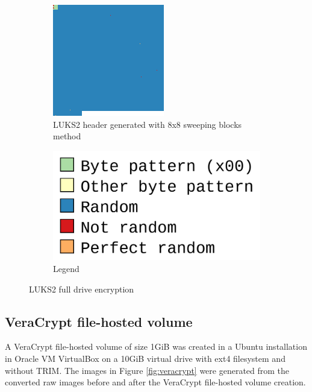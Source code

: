 \documentclass[
  digital, %
  color,   %
  oneside, %
  lof,     %
  nolot,     %
]{fithesis4}
\begin{document}
\begin{figure}
\begin{subfigure}[t]{.45\textwidth}
    \includegraphics[width=\textwidth,interpolate=false]{ext4-luks2-head.png}
    \caption{LUKS2 header generated with 8x8 sweeping blocks method}
    \label{fig:luks-header}
  \end{subfigure}
  \begin{subfigure}[b]{.45\textwidth}
    \centering
    \includegraphics[width=\textwidth]{legend.png}
    \caption{Legend}
    \label{fig:luks-legend} 
  \end{subfigure}
  \caption{LUKS2 full drive encryption}
  \label{fig:luks}
\end{figure}

\subsection{VeraCrypt file-hosted volume}
\label{ssec:veracrypt-file-hosted-volume}
A VeraCrypt file-hosted volume of size 1GiB was created in a Ubuntu installation in Oracle VM VirtualBox on a 10GiB virtual drive with ext4 filesystem and without TRIM.
The images in Figure \ref{fig:veracrypt} were generated from the converted raw images before and after the VeraCrypt file-hosted volume\cite{veracryptvol} creation.
\end{document}
